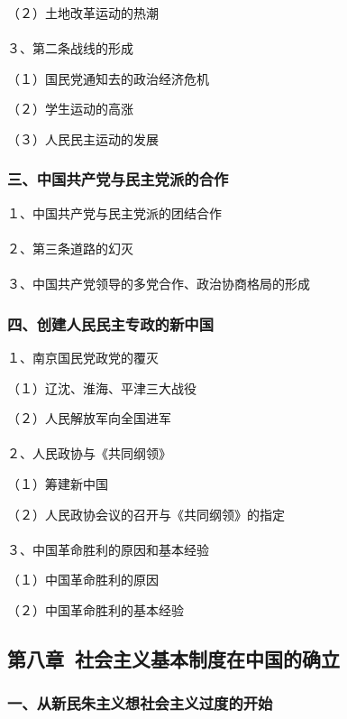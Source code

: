 \documentclass{ctexart}
\begin{document}
（２）土地改革运动的热潮
\\\\

３、第二条战线的形成

（１）国民党通知去的政治经济危机

（２）学生运动的高涨

（３）人民民主运动的发展

\subsubsection{三、中国共产党与民主党派的合作}
１、中国共产党与民主党派的团结合作
\\\\

２、第三条道路的幻灭
\\\\

３、中国共产党领导的多党合作、政治协商格局的形成

\subsubsection{四、创建人民民主专政的新中国}

１、南京国民党政党的覆灭

（１）辽沈、淮海、平津三大战役

（２）人民解放军向全国进军
\\\\

２、人民政协与《共同纲领》

（１）筹建新中国

（２）人民政协会议的召开与《共同纲领》的指定
\\\\

３、中国革命胜利的原因和基本经验

（１）中国革命胜利的原因

（２）中国革命胜利的基本经验



\subsection{第八章\ 社会主义基本制度在中国的确立}

\subsubsection{一、从新民朱主义想社会主义过度的开始}
\end{document}
